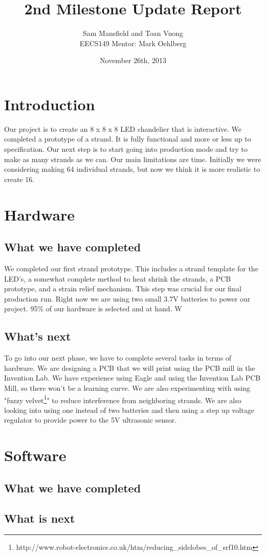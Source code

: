 \documentclass[10pt]{article}
\begin{document}
  \title{2nd Milestone Update Report}
  \author{Sam Mansfield and Toan Vuong\\
          EECS149
          Mentor: Mark Oehlberg}
  \date{November 26th, 2013}
  
  \maketitle

  \section{Introduction}
    Our project is to create an 8 x 8 x 8 LED chandelier that is interactive. We completed a prototype of a strand. It is fully functional and more or less up to specification. Our next step is to start going into production mode and try to make as many strands as we can. Our main limitations are time. Initially we were considering making 64 individual strands, but now we think it is more realistic to create 16.
    
  \section{Hardware}
    \subsection{What we have completed}
      We completed our first strand prototype. This includes a strand template for the LED's, a somewhat complete method to heat shrink the strands, a PCB prototype, and a strain relief mechanism. This step was crucial for our final production run. Right now we are using two small 3.7V batteries to power our project. 95\% of our hardware is selected and at hand. W
    \subsection{What's next}
      To go into our next phase, we have to complete several tasks in terms of hardware. We are designing a PCB that we will print using the PCB mill in the Invention Lab. We have experience using Eagle and using the Invention Lab PCB Mill, so there won't be a learning curve. We are also experimenting with using "fuzzy velvet\footnote{http://www.robot-electronics.co.uk/htm/reducing_sidelobes_of_srf10.htm}" to reduce interference from neighboring strands. We are also looking into using one instead of two batteries and then using a step up voltage regulator to provide power to the 5V ultrasonic sensor.
  \section{Software}
    \subsection{What we have completed}
    
    \subsection{What is next}
\end{document}
